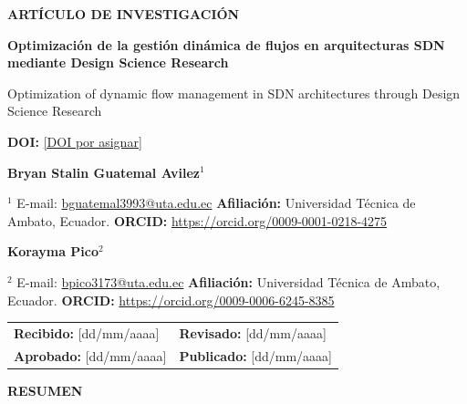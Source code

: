 \documentclass[12pt,a4paper]{article}
\newcommand{\articletitlees}{Optimización de la gestión dinámica de flujos en arquitecturas SDN mediante Design Science Research}
\newcommand{\articletitleen}{Optimization of dynamic flow management in SDN architectures through Design Science Research}
\newcommand{\articledoi}{[DOI por asignar]}
\newcommand{\fecharecibido}{[dd/mm/aaaa]}
\newcommand{\fecharevisado}{[dd/mm/aaaa]}
\newcommand{\fechaaprobado}{[dd/mm/aaaa]}
\newcommand{\fechapublicado}{[dd/mm/aaaa]}
\begin{document}

\vspace*{0.4cm}

\begin{center}
\textbf{ARTÍCULO DE INVESTIGACIÓN}
\end{center}

\vspace{0.7cm}

{\bfseries \articletitlees}

\vspace{0.35cm}

{\small \articletitleen}

\vspace{0.45cm}

\begin{center}
\textbf{DOI:} \href{\articledoi}{\articledoi}
\end{center}

\vspace{0.6cm}

\textbf{Bryan Stalin Guatemal Avilez}$^{1}$

{\small
$^{1}$ E-mail: \href{mailto:bguatemal3993@uta.edu.ec}{bguatemal3993@uta.edu.ec}
\quad \textbf{Afiliación:} Universidad Técnica de Ambato, Ecuador.
\quad \textbf{ORCID:} \href{https://orcid.org/0009-0001-0218-4275}{https://orcid.org/0009-0001-0218-4275}
}

\vspace{0.35cm}

\textbf{Korayma Pico}$^{2}$

{\small
$^{2}$ E-mail: \href{mailto:bpico3173@uta.edu.ec}{bpico3173@uta.edu.ec}
\quad \textbf{Afiliación:} Universidad Técnica de Ambato, Ecuador.
\quad \textbf{ORCID:} \href{https://orcid.org/0009-0006-6245-8385}{https://orcid.org/0009-0006-6245-8385}
}

\vspace{0.7cm}

\begin{center}
\begin{tabular}{p{} p{}}
\textbf{Recibido:} \fecharecibido & \textbf{Revisado:} \fecharevisado \\[0.2cm]
\textbf{Aprobado:} \fechaaprobado & \textbf{Publicado:} \fechapublicado
\end{tabular}
\end{center}

\vspace{0.8cm}

\textbf{RESUMEN}
\end{document}
